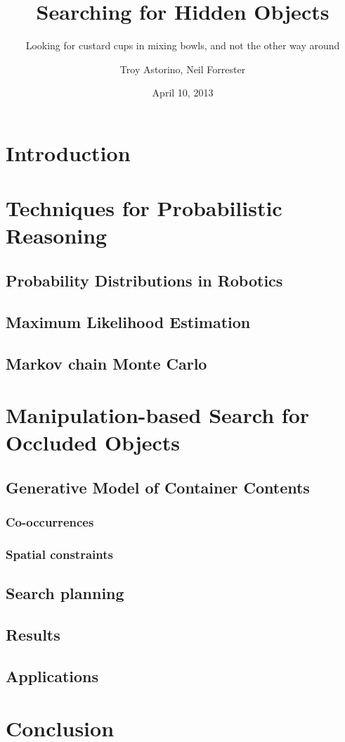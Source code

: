 \documentclass{beamer}
\title{Searching for Hidden Objects}
\subtitle{Looking for custard cups in mixing bowls, and not the other way around}
\author{Troy Astorino, Neil Forrester}
\date{April 10, 2013}
\institute[6.834 -- MIT]{Cognitive Robotics \\ Massachusetts Institute of Technology}
\begin{document}
\section{Introduction}


\section{Techniques for Probabilistic Reasoning}
\subsection{Probability Distributions in Robotics}


\subsection{Maximum Likelihood Estimation}


\subsection{Markov chain Monte Carlo}


\section{Manipulation-based Search for Occluded Objects}


\subsection{Generative Model of Container Contents}
\subsubsection*{Co-occurrences}






\subsubsection*{Spatial constraints}


\subsection{Search planning}


\subsection{Results}


\subsection{Applications}


\section{Conclusion}

\end{document}
